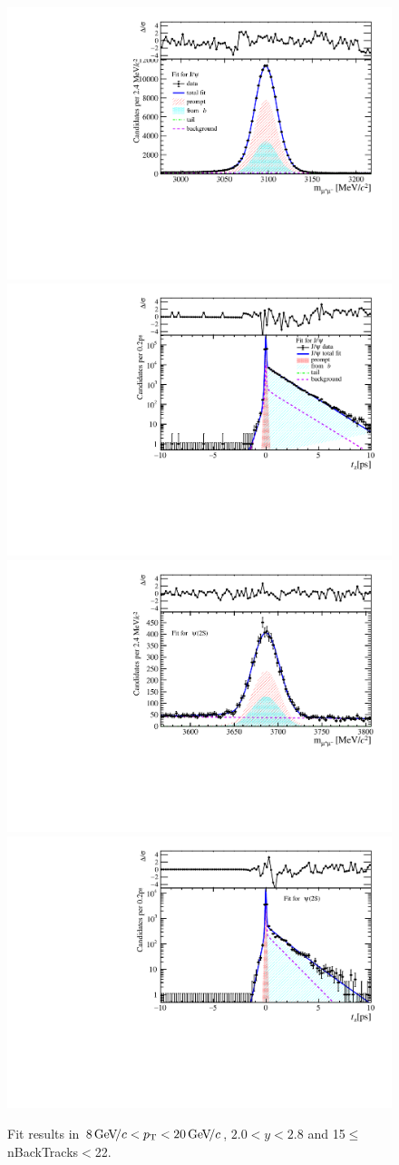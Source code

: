 \begin{figure}[H]
\begin{center}
\includegraphics[width=0.47\linewidth]{pdf/Jpsi/drawmassB/n3y1pt5.pdf}
\includegraphics[width=0.47\linewidth]{pdf/Jpsi/2DFitB/n3y1pt5.pdf}
\vspace*{-0.5cm}
\includegraphics[width=0.47\linewidth]{pdf/Psi2S/drawmassB/n3y1pt5.pdf}
\includegraphics[width=0.47\linewidth]{pdf/Psi2S/2DFitB/n3y1pt5.pdf}
\vspace*{-0.5cm}
\end{center}
\caption{Fit results in $8\text{\,Ge\kern -0.1em V\!/}c<p_{\mathrm{T}}<20\text{\,Ge\kern -0.1em V\!/}c$, $2.0<y<2.8$ and 15$\leq$nBackTracks$<$22.}
\label{Fitn3y1pt5}
\end{figure}
